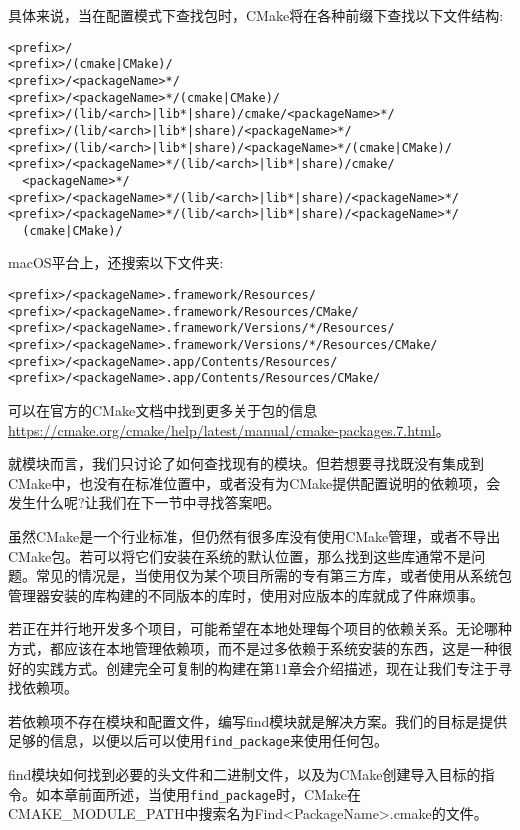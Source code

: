 具体来说，当在配置模式下查找包时，CMake将在各种前缀下查找以下文件结构:

\begin{lstlisting}[style=styleCMake]
<prefix>/
<prefix>/(cmake|CMake)/
<prefix>/<packageName>*/
<prefix>/<packageName>*/(cmake|CMake)/
<prefix>/(lib/<arch>|lib*|share)/cmake/<packageName>*/
<prefix>/(lib/<arch>|lib*|share)/<packageName>*/
<prefix>/(lib/<arch>|lib*|share)/<packageName>*/(cmake|CMake)/
<prefix>/<packageName>*/(lib/<arch>|lib*|share)/cmake/
  <packageName>*/
<prefix>/<packageName>*/(lib/<arch>|lib*|share)/<packageName>*/
<prefix>/<packageName>*/(lib/<arch>|lib*|share)/<packageName>*/
  (cmake|CMake)/
\end{lstlisting}

macOS平台上，还搜索以下文件夹:

\begin{lstlisting}[style=styleCMake]
<prefix>/<packageName>.framework/Resources/
<prefix>/<packageName>.framework/Resources/CMake/
<prefix>/<packageName>.framework/Versions/*/Resources/
<prefix>/<packageName>.framework/Versions/*/Resources/CMake/
<prefix>/<packageName>.app/Contents/Resources/
<prefix>/<packageName>.app/Contents/Resources/CMake/
\end{lstlisting}

可以在官方的CMake文档中找到更多关于包的信息\url{https://cmake.org/cmake/help/latest/manual/cmake-packages.7.html}。

就模块而言，我们只讨论了如何查找现有的模块。但若想要寻找既没有集成到CMake中，也没有在标准位置中，或者没有为CMake提供配置说明的依赖项，会发生什么呢?让我们在下一节中寻找答案吧。


虽然CMake是一个行业标准，但仍然有很多库没有使用CMake管理，或者不导出CMake包。若可以将它们安装在系统的默认位置，那么找到这些库通常不是问题。常见的情况是，当使用仅为某个项目所需的专有第三方库，或者使用从系统包管理器安装的库构建的不同版本的库时，使用对应版本的库就成了件麻烦事。

若正在并行地开发多个项目，可能希望在本地处理每个项目的依赖关系。无论哪种方式，都应该在本地管理依赖项，而不是过多依赖于系统安装的东西，这是一种很好的实践方式。创建完全可复制的构建在第11章会介绍描述，现在让我们专注于寻找依赖项。 

若依赖项不存在模块和配置文件，编写find模块就是解决方案。我们的目标是提供足够的信息，以便以后可以使用\texttt{find\_package}来使用任何包。

find模块如何找到必要的头文件和二进制文件，以及为CMake创建导入目标的指令。如本章前面所述，当使用\texttt{find\_package}时，CMake在CMAKE\_MODULE\_PATH中搜索名为Find<PackageName>.cmake的文件。

